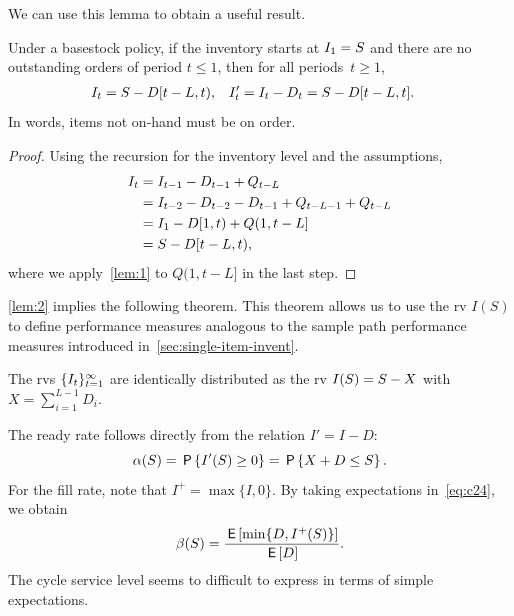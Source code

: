 \documentclass[queueing-book.tex]{subfiles}
\begin{document}
We can use this lemma to obtain a useful result.
\begin{lemma}\label{lem:2}
Under a basestock policy, if the inventory starts at $\IL_{1} = S$ and there are no outstanding orders of period $t \leq 1$, then for all periods~$t\geq 1$,
  \begin{align*}
    \IL_t&= S - D[t-L, t), &  \IL_t'&= \IL_{t} - D_{t} = S - D[t-L, t].
  \end{align*}
In words, items not on-hand must be on order.
\end{lemma}
\begin{proof}
Using the recursion for the inventory level and the assumptions,
\begin{align*}
  \IL_{t}
&= \IL_{t-1} -D_{t-1}+ Q_{t-L} \\
&= \IL_{t-2}- D_{t-2}  - D_{t-1} +Q_{t-L-1} + Q_{t-L}\\
&= \IL_{1}- D[1, t) + Q(1, t-L] \\
&= S - D[t-L, t),
\end{align*}
where we apply~\cref{lem:1} to $Q(1, t-L]$ in the last step.
\end{proof}

\cref{lem:2} implies the following theorem.
This theorem allows us to use the rv $I(S)$ to define performance measures analogous to the sample path performance measures introduced in~\cref{sec:single-item-invent}.
\begin{theorem}
The rvs $\{\IL_{t}\}_{t=1}^{\infty}$ are identically distributed as the rv $\IL(S) = S - X$ with $X=\sum_{i=1}^{L-1} D_{i}$.
\end{theorem}

The ready rate follows directly from the relation $I' = I- D$:
\begin{equation}
\label{eq:5}
\alpha(S) =  \P{I'(S)\geq 0} = \P{X+D\leq S}.
\end{equation}
For the fill rate, note that $I^{+} = \max\{I, 0\}$. By taking expectations in~\cref{eq:c24},  we obtain
\begin{equation*}
\beta(S) = \frac{\E{\min\{D, I^{+}(S)\}}}{\E D}.
\end{equation*}
The cycle service level seems to difficult to express in terms of simple expectations.
\end{document}
